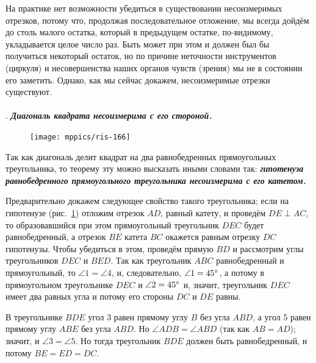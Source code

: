 \documentclass[oneside]{book}
\begin{document}
На практике нет возможности убедиться в существовании несоизмеримых отрезков, потому что, продолжая последовательное отложение, мы всегда дойдём до столь малого остатка, который в предыдущем остатке, по-видимому, укладывается целое число раз.
Быть может при этом и должен был бы получиться некоторый остаток, но по причине неточности инструментов (циркуля) и несовершенства наших органов чувств (зрения) мы не в состоянии его заметить.
Однако, как мы сейчас докажем, несоизмеримые отрезки существуют.


\paragraph{}\label{1938/149}
.
\textbf{\emph{Диагональ квадрата несоизмерима с его стороной.}}

\begin{figure}
\centering
\texttt{[image: mppics/ris-166]}
\caption{}\label{1938/ris-166}
\end{figure}

Так как диагональ делит квадрат на два равнобедренных прямоугольных треугольника, то теорему эту можно высказать иными словами так:
\textbf{\emph{гипотенуза равнобедренного прямоугольного треугольника несоизмерима с его катетом.}}

Предварительно докажем следующее свойство такого треугольника;
если на гипотенузе (рис.~\ref{1938/ris-166}) отложим отрезок $AD$, равный катету, и проведём $DE\perp AC$, то образовавшийся при этом прямоугольный треугольник $DEC$ будет равнобедренный, а отрезок $BE$ катета $BC$ окажется равным отрезку $DC$ гипотенузы.
Чтобы убедиться в этом, проведём прямую $BD$ и рассмотрим углы треугольников $DEC$ и $BED$.
Так как треугольник $ABC$ равнобедренный и прямоугольный, то $\angle 1 = \angle 4$, и, следовательно, $\angle 1 = 45\degree$, а потому в прямоугольном треугольнике $DEC$ и $\angle 2 = 45\degree$ и, значит, треугольник $DEC$ имеет два равных угла и потому его стороны $DC$ и $DE$ равны.

В треугольнике $BDE$ угол 3 равен прямому углу $B$ без угла $ABD$, а угол 5 равен прямому углу $ABE$ без угла $ABD$.
Но $\angle ADB = \angle ABD$ (так как $AB=AD$);
значит, и $\angle 3 = \angle 5$.
Но тогда треугольник $BDE$ должен быть равнобедренный, и потому $BE=ED=DC$.
\end{document}
